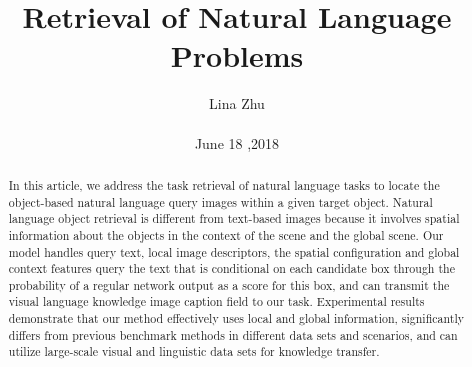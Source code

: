 \documentclass[10pt,twocolumn,letterpaper]{article}
\begin{document}
	\title{Retrieval of Natural Language Problems}
	\author{Lina Zhu\\\\June 18 ,2018}

\maketitle
\begin{abstract}
	In this article, we address the task retrieval of natural language tasks to locate the object-based natural language query images within a given target object. Natural language object retrieval is different from text-based images because it involves spatial information about the objects in the context of the scene and the global scene. Our model handles query text, local image descriptors,
	the spatial configuration and global context features query the text that is conditional on each candidate box through the probability of a regular network output as a score for this box, and can transmit the visual language knowledge image caption field to our task. Experimental results demonstrate that our method effectively uses local and global information, significantly differs from previous benchmark methods in different data sets and scenarios, and can utilize large-scale visual and linguistic data sets for knowledge transfer.
\end{abstract}
\end{document}
